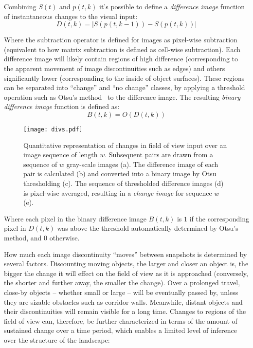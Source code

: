 \documentclass[twocolumn, 9pt,fleqn]{jsproceedings}
\begin{document}
Combining $S(t)$ and $p(t, k)$ it's possible to define a \textit{difference image} function of instantaneous changes to the visual input:
\begin{equation}
D(t, k) = | S(p(t, k-1)) - S(p(t, k)) |
\end{equation}

Where the subtraction operator is defined for images as pixel-wise subtraction (equivalent to how matrix subtraction is defined as cell-wise subtraction). Each difference image will likely contain regions of high difference (corresponding to the apparent movement of image discontinuities such as edges) and others significantly lower (corresponding to the inside of object surfaces). These regions can be separated into ``change'' and ``no change'' classes, by applying a threshold operation such as Otsu's method~\cite{OTS79} to the difference image. The resulting \textit{binary difference image} function is defined as:
\begin{equation}
B(t, k) = O(D(t, k))
\end{equation}

\begin{figure}[h!]
\texttt{[image: divs.pdf]}
\caption{Quantitative representation of changes in field of view input over an image sequence of length $w$. Subsequent pairs are drawn from a sequence of $w$ gray-scale images (a). The difference image of each pair is calculated (b) and converted into a binary image by Otsu thresholding (c). The sequence of thresholded difference images (d) is pixel-wise averaged, resulting in a \textit{change image} for sequence $w$ (e).}
\label{fig:divs}
\end{figure}

Where each pixel in the binary difference image $B(t, k)$ is $1$ if the corresponding pixel in $D(t, k)$ was above the threshold automatically determined by Otsu's method, and $0$ otherwise.

How much each image discontinuity ``moves'' between snapshots is determined by several factors. Discounting moving objects, the larger and closer an object is, the bigger the change it will effect on the field of view as it is approached (conversely, the shorter and further away, the smaller the change). Over a prolonged travel, close-by objects -- whether small or large -- will be eventually passed by, unless they are sizable obstacles such as corridor walls. Meanwhile, distant objects and their discontinuities will remain visible for a long time. Changes to regions of the field of view can, therefore, be further characterized in terms of the amount of sustained change over a time period, which enables a limited level of inference over the structure of the landscape:
\end{document}
